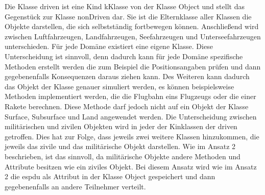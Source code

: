 Die Klasse \glqq driven\grqq{} ist eine Kind
kKlasse von der Klasse  \glqq Object\grqq{} und stellt das Gegenstück zur Klasse \glqq nonDriven\grqq{} dar. Sie ist die Elternklasse aller Klassen die Objekte darstellen, die sich selbstständig fortbewegen können. Anschließend  wird zwischen Luftfahrzeugen, Landfahrzeugen, Seefahrzeugen und Unterseefahrzeugen unterschieden. Für jede Domäne existiert eine eigene Klasse. Diese Unterscheidung ist sinnvoll, denn dadurch kann für jede Domäne spezifische Methoden erstellt werden die zum Beispiel die Positionsangaben prüfen und dann gegebenenfalls Konsequenzen daraus ziehen kann. Des Weiteren kann dadurch das Objekt der Klasse genauer simuliert werden, es können beispielsweise Methoden implementiert werden, die die Flugbahn eins Flugzeugs oder die einer Rakete berechnen. Diese Methode darf jedoch nicht auf ein Objekt der Klasse \glqq Surface\grqq{}, \glqq Subsurface\grqq{} und \glqq Land\grqq{} angewendet werden. Die  Unterscheidung  zwischen militärischen und zivilen Objekten wird in jeder der Kinklassen  der \glqq driven\grqq{} getroffen. Dies hat zur Folge, dass jeweils zwei weitere Klassen hinzukommen, die jeweils das zivile und das militärische Objekt darstellen. Wie im Ansatz 2 beschrieben, ist das sinnvoll, da militärische Objekte andere Methoden und Attribute besitzen wie ein ziviles Objekt.
Bei diesem Ansatz wird wie im Ansatz 2 die \ac{espdu} als Attribut in der Klasse \glqq Object\grqq{} gespeichert und dann gegebenenfalls an andere Teilnehmer verteilt.\\

